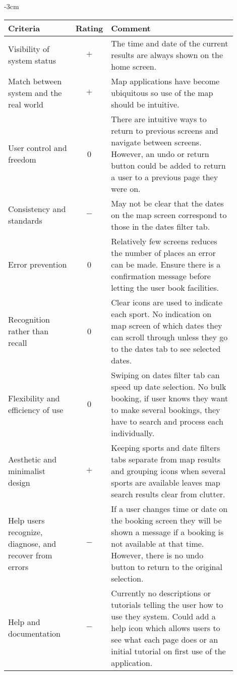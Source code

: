 \begin{center}
	\begin{adjustwidth*}{}{-3cm}
	\renewcommand{\arraystretch}{2}
	\begin{longtable}{@{\extracolsep{\fill}}p{0.3\linewidth} c p{0.6\linewidth}}
		\toprule
		\textbf{Criteria} & \textbf{Rating} & \textbf{Comment}\\
		\midrule
		Visibility of system status & $+$ & The time and date of the current
		results are always shown on the home screen.\\

		Match between system and the real world & $+$ & Map applications have
		become ubiquitous so use of the map should be intuitive.\\

		User control and freedom & 0 & There are intuitive ways to return to
		previous screens and navigate between screens. However, an undo or
		return button could be added to return a user to a previous page they
		were on.\\

		Consistency and standards & $-$ & May not be clear that the dates on
		the map screen correspond to those in the dates filter tab.\\

		Error prevention & 0 & Relatively few screens reduces the number of
		places an error can be made. Ensure there is a confirmation message
		before letting the user book facilities.\\

		Recognition rather than recall & 0 & Clear icons are used to indicate
		each sport. No indication on map screen of which dates they can scroll
		through unless they go to the dates tab to see selected dates.\\

		Flexibility and efficiency of use & 0 & Swiping on dates filter tab can
		speed up date selection. No bulk booking, if user knows they want to
		make several bookings, they have to search and process each
		individually. \\

		Aesthetic and minimalist design & $+$ & Keeping sports and date filters
		tabs separate from map results and grouping icons when several sports
		are available leaves map search results clear from clutter.\\

		Help users recognize, diagnose, and recover from errors & $-$ & If a
		user changes time or date on the booking screen they will be shown a
		message if a booking is not available at that time. However, there is
		no undo button to return to the original selection.\\

		Help and documentation & $-$ & Currently no descriptions or tutorials
		telling the user how to use they system. Could add a help icon which
		allows users to see what each page does or an initial tutorial on first
		use of the application.\\
		\bottomrule
	\end{longtable}
\end{adjustwidth*}
\end{center}

